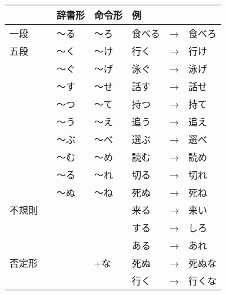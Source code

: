 	\newpage		
	
	\noindent
	\begin{table}[h]
	\centering
	\begin{tabular}{llllll}
		\toprule[2pt]
		& 辞書形 & 命令形 & 例 & & \\
		\midrule
		一段 & 〜る & 〜ろ & 食べる&→&食べろ\\
		\midrule
		五段 & 〜く & 〜け & 行く&→&行け\\
		& 〜ぐ & 〜げ & 泳ぐ&→&泳げ\\
		& 〜す & 〜せ & 話す&→&話せ\\
		& 〜つ & 〜て & 持つ&→&持て\\
		& 〜う & 〜え & 追う&→&追え\\
		& 〜ぶ & 〜べ & 選ぶ&→&選べ\\
		& 〜む & 〜め & 読む&→&読め\\
		& 〜る & 〜れ & 切る&→&切れ\\
		& 〜ぬ & 〜ね & 死ぬ&→&死ね\\
		\midrule
		不規則	& & & 来る &→& 来い \\
		& & & する &→& しろ \\
		& & & ある &→& あれ \\
		\midrule
		否定形　& &+な & 死ぬ &→&死ぬな\\
		& & & 行く &→& 行くな \\
		\bottomrule[2pt]
	\end{tabular}
	\end{table}
